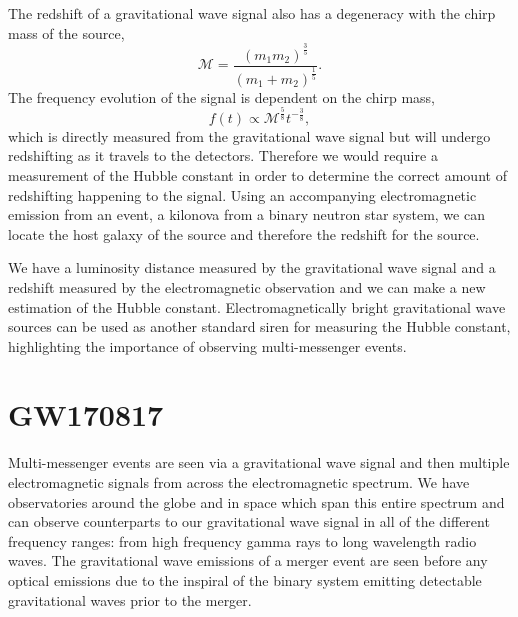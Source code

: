 The redshift of a gravitational wave signal also has a degeneracy with the chirp mass of the source,
%
\begin{equation}
\mathcal{M} = \frac{(m_1 m_2)^{\frac{3}{5}}}{(m_1 + m_2)^{\frac{1}{5}}}.
\end{equation}
%
The frequency evolution of the signal is dependent on the chirp mass,
%
\begin{equation}
f(t) \propto \mathcal{M}^{\frac{5}{8}}t^{-\frac{3}{8}},
\end{equation}
%
which is directly measured from the gravitational wave signal but will undergo redshifting as it travels to the detectors. Therefore we would require a measurement of the Hubble constant in order to determine the correct amount of redshifting happening to the signal. Using an accompanying electromagnetic emission from an event, a kilonova from a binary neutron star system, we can locate the host galaxy of the source and therefore the redshift for the source.

We have a luminosity distance measured by the gravitational wave signal and a redshift measured by the electromagnetic observation and we can make a new estimation of the Hubble constant. Electromagnetically bright gravitational wave sources can be used as another standard siren for measuring the Hubble constant, highlighting the importance of observing multi-messenger events.

\section{GW170817}

Multi-messenger events are seen via a gravitational wave signal and then multiple electromagnetic signals from across the electromagnetic spectrum. We have observatories around the globe and in space which span this entire spectrum and can observe counterparts to our gravitational wave signal in all of the different frequency ranges: from high frequency gamma rays to long wavelength radio waves. The gravitational wave emissions of a merger event are seen before any optical emissions due to the inspiral of the binary system emitting detectable gravitational waves prior to the merger.

